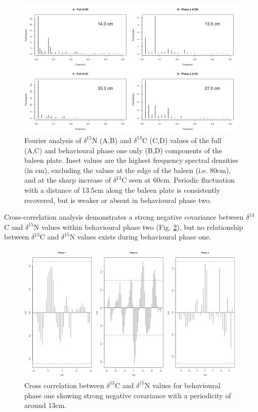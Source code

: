 \documentclass[a4paper,12pt]{article}
\begin{document}
\begin{figure}[!htbp]
  \centering
  \includegraphics[width = \linewidth]{figures/Figure-S1-periodograms.png}
  \caption{Fourier analysis of $\delta^{15}$N (A,B) and $\delta^{13}$C (C,D) values of the full (A,C) and behavioural phase one only (B,D) components of the baleen plate. Inset values are the highest frequency spectral densities (in cm), excluding the values at the edge of the baleen (i.e. 80cm), and at the sharp increase of $\delta^{13}$C seen at 60cm. Periodic fluctuation with a distance of 13.5cm along the baleen plate is consistently recovered, but is weaker or absent in behavioural phase two.} 
  \label{figs1}
\end{figure}
 
Cross-correlation analysis demonstrates a strong negative covariance between $\delta^{13}$C and $\delta^{15}$N  values within behavioural phase two (Fig. \ref{figs2}), but no relationship between $\delta^{13}$C and $\delta^{15}$N values exists during behavioural phase one.

\begin{figure}[!htbp]
  \centering
  \includegraphics[width = \linewidth]{figures/Figure-S2-cross-cor.png}
  \caption{Cross correlation between $\delta^{13}$C and $\delta^{15}$N values for behavioural phase one showing strong negative covariance with a periodicity of around 13cm.} %
  \label{figs2}
\end{figure}
 
\end{document}
